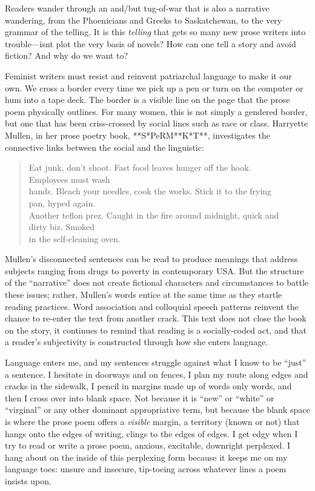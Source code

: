 \documentclass[
]{memoir}
\begin{document}
Readers wander through an and/but tug-of-war that is also a narrative
wandering, from the Phoenicians and Greeks to Saskatchewan, to the very
grammar of the telling. It is this \emph{telling} that gets so many new
prose writers into trouble---isnt plot the very basis of novels? How can
one tell a story and avoid fiction? And why do we want to?

Feminist writers must resist and reinvent patriarchal language to make
it our own. We cross a border every time we pick up a pen or turn on the
computer or hum into a tape deck. The border is a visible line on the
page that the prose poem physically outlines. For many women, this is
not simply a gendered border, but one that has been criss-crossed by
social lines such as race or class. Harryette Mullen, in her prose
poetry book, **S*PeRM**K*T**, investigates the connective links between
the social and the linguistic:

\begin{verse}
Eat junk, don’t shoot. Fast food leaves hunger off the hook.\\
Employees must wash\\
hands. Bleach your needles, cook the works. Stick it to the frying\\
pan, hyped again.\\
Another teflon prez. Caught in the fire around midnight, quick and\\
dirty biz. Smoked\\
in the self-cleaning oven.\\
\end{verse}

Mullen's disconnected sentences can be read to produce meanings that
address subjects ranging from drugs to poverty in contemporary USA. But
the structure of the ``narrative'' does not create fictional characters
and circumstances to battle these issues; rather, Mullen's words entice
at the same time as they startle reading practices. Word association and
colloquial speech patterns reinvent the chance to re-enter the text from
another crack. This text does not close the book on the story, it
continues to remind that reading is a socially-coded act, and that a
reader's subjectivity is constructed through how she enters language.

Language enters me, and my sentences struggle against what I know to be
``just'' a sentence. I hesitate in doorways and on fences, I plan my
route along edges and cracks in the sidewalk, I pencil in margins made
up of words only words, and then I cross over into blank space. Not
because it is ``new'' or ``white'' or ``virginal'' or any other dominant
appropriative term, but because the blank space is where the prose poem
offers a \emph{visible} margin, a territory (known or not) that hangs
onto the edges of writing, clings to the edges of edges. I get edgy when
I try to read or write a prose poem, anxious, excitable, downright
perplexed. I hang about on the inside of this perplexing form because it
keeps me on my language toes: unsure and insecure, tip-toeing across
whatever lines a poem insists upon.
\end{document}
